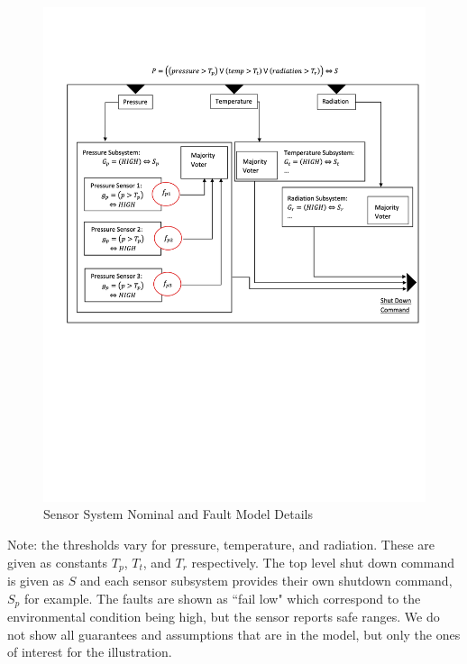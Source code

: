 \begin{figure}[h!]
	\begin{center}
		\includegraphics[width=1.0\textwidth, trim={0 7.5cm 0 0},clip]{images/PWRFigureContracts.png}
	\end{center}
	\vspace{-6em}
	\caption{Sensor System Nominal and Fault Model Details}
	\label{fig:sensorSysContracts}
\end{figure}

Note: the thresholds vary for pressure, temperature, and radiation. These are given as constants $T_p$, $T_t$, and $T_r$ respectively. The top level shut down command is given as $S$ and each sensor subsystem provides their own shutdown command, $S_p$ for example.  The faults are shown as ``fail low" which correspond to the environmental condition being high, but the sensor reports safe ranges. We do not show all guarantees and assumptions that are in the model, but only the ones of interest for the illustration. 

